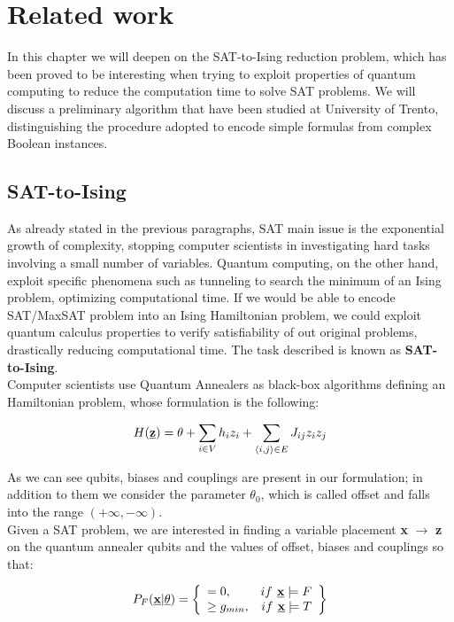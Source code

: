 \chapter{Related work}
\label{cha:related}

In this chapter we will deepen on the SAT-to-Ising reduction problem, which has been proved to be interesting when trying to exploit properties of quantum computing to reduce the computation time to solve SAT problems. We will discuss a preliminary algorithm that have been studied at University of Trento, distinguishing the procedure adopted to encode simple formulas from complex Boolean instances.

\section{SAT-to-Ising}
\label{sec:SATtoQUBO}

As already stated in the previous paragraphs, SAT main issue is the exponential growth of complexity, stopping computer scientists in investigating hard tasks involving a small number of variables. Quantum computing, on the other hand, exploit specific phenomena such as tunneling to search the minimum of an Ising problem, optimizing computational time. If we would be able to encode SAT/MaxSAT problem into an Ising Hamiltonian problem, we could exploit quantum calculus properties to verify satisfiability of out original problems, drastically reducing computational time. The task described is known as \textbf{SAT-to-Ising}. \\
Computer scientists use Quantum Annealers as black-box algorithms defining an Hamiltonian problem, whose formulation is the following:

\begin{equation}
    H(\textbf{\underline{z}}) =\theta + \sum_{i \in V} h_iz_i + \sum_{\langle i,j\rangle \in E} J_{ij} z_iz_j
\end{equation}

As we can see qubits, biases and couplings are present in our formulation; in addition to them we consider the parameter $\theta_0$, which is called offset and falls into the range $(+\infty, -\infty)$. \\
Given a SAT problem, we are interested in finding a variable placement \textbf{x} $\rightarrow$ \textbf{z} on the quantum annealer qubits and the values of offset, biases and couplings so that:

\begin{equation}
    P_F(\underline{\textbf{x}} | \underline{\theta}) = 
    \left\{
        \begin{array}{lr}
            = 0, & if \textbf{ \underline{x}} \models F \\
            \geq g_{min}, & if \textbf{ \underline{x}} \models T
        \end{array}
    \right\}
\end{equation}

